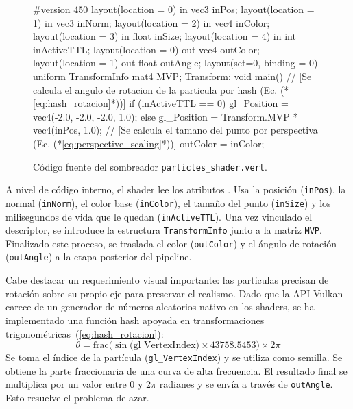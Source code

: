 \begin{figure}[!htbp]
    \centering
\begin{carbonbox}
#version 450
layout(location = 0) in vec3 inPos;
layout(location = 1) in vec3 inNorm;
layout(location = 2) in vec4 inColor;
layout(location = 3) in float inSize;
layout(location = 4) in int inActiveTTL;
layout(location = 0) out vec4 outColor;
layout(location = 1) out float outAngle;
layout(set=0, binding = 0) uniform TransformInfo { mat4 MVP; } Transform;
void main() {
    // [Se calcula el angulo de rotacion de la particula por hash (Ec. (*\ref{eq:hash_rotacion}*))]
    if (inActiveTTL == 0) {
        gl_Position = vec4(-2.0, -2.0, -2.0, 1.0);
    } else {
        gl_Position = Transform.MVP * vec4(inPos, 1.0);
        // [Se calcula el tamano del punto por perspectiva (Ec. (*\ref{eq:perspective_scaling}*))]
        outColor = inColor;
    }
}
\end{carbonbox}
    \caption{Código fuente del sombreador \texttt{particles\_shader.vert}.}
    \label{fig:particles_shader_vert}
\end{figure}

A nivel de código interno, el shader lee los atributos . Usa la posición (\texttt{inPos}), la normal (\texttt{inNorm}), el color base (\texttt{inColor}), el tamaño del punto (\texttt{inSize}) y los milisegundos de vida que le quedan (\texttt{inActiveTTL}). Una vez vinculado el descriptor, se introduce la estructura \texttt{TransformInfo} junto a la matriz \texttt{MVP}. Finalizado este proceso, se traslada el color (\texttt{outColor}) y el ángulo de rotación (\texttt{outAngle}) a la etapa posterior del pipeline.

Cabe destacar un requerimiento visual importante: las particulas precisan de rotación sobre su propio eje para preservar el realismo. Dado que la API Vulkan carece de un generador de números aleatorios nativo en los shaders, se ha implementado una función hash apoyada en transformaciones trigonométricas~(\ref{eq:hash_rotacion}):
\begin{equation}
    \label{eq:hash_rotacion}
    \theta = \text{frac}\Big(\sin\big(\text{gl\_VertexIndex}\big) \times 43758.5453\Big) \times 2\pi
\end{equation}
Se toma el índice de la partícula (\texttt{gl\_VertexIndex}) y se utiliza como semilla. Se obtiene la parte fraccionaria de una curva de alta frecuencia. El resultado final se multiplica por un valor entre $0$ y $2\pi$ radianes y se envía a través de \texttt{outAngle}. Esto resuelve el problema de azar.

